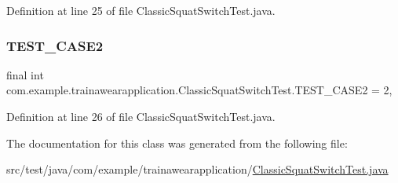 Definition at line 25 of file Classic\+Squat\+Switch\+Test.\+java.

\mbox{\label{classcom_1_1example_1_1trainawearapplication_1_1_classic_squat_switch_test_adfafc37af9e307475f809327d404008d}} 
\subsubsection{\texorpdfstring{TEST\_CASE2}{TEST\_CASE2}}
{\footnotesize\ttfamily final int com.\+example.\+trainawearapplication.\+Classic\+Squat\+Switch\+Test.\+T\+E\+S\+T\+\_\+\+C\+A\+S\+E2 = 2\hspace{0.3cm}{\ttfamily [static]}, {\ttfamily [private]}}



Definition at line 26 of file Classic\+Squat\+Switch\+Test.\+java.



The documentation for this class was generated from the following file\+:\begin{DoxyCompactItemize}
\item 
src/test/java/com/example/trainawearapplication/\mbox{\hyperlink{_classic_squat_switch_test_8java}{Classic\+Squat\+Switch\+Test.\+java}}\end{DoxyCompactItemize}
